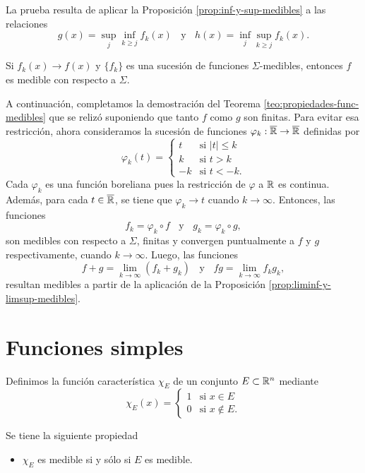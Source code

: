 La prueba resulta de aplicar la Proposici\'on \ref{prop:inf-y-sup-medibles}
a las relaciones 
\[
g(x)=\sup\limits_{j} \inf\limits_{k\geq j} f_k(x)
\;\;\mbox{ y }\;\;
h(x)=\inf\limits_{j}\sup\limits_{k \geq j} f_k(x).
\]

\begin{corolario}{}
Si $f_k(x) \to f(x)$ y $\{f_k\}$ es una sucesi\'on de funciones $\Sigma$-medibles, entonces $f$ es medible con respecto a $\Sigma$.
\end{corolario}

A continuaci\'on, completamos la demostraci\'on del Teorema \ref{teo:propiedades-func-medibles} que se reliz\'o suponiendo
que tanto $f$ como $g$ son finitas. 
Para evitar esa restricci\'on, ahora consideramos la sucesi\'on de funciones $\varphi_k:\overline{\mathbb{R}} \to \overline{\mathbb{R}}$ definidas por
\[
\varphi_k(t)=
\left\{
\begin{array}{rl}
   t  &  \mbox{si } |t|\leq k \\
   k  &  \mbox{si } t>k\\
   -k &  \mbox{si } t<-k.
\end{array}
\right.
\]
Cada $\varphi_k$ es una funci\'on boreliana pues la restricci\'on de $\varphi$ a $\mathbb{R}$ es continua. Adem\'as, para cada $t\in \overline{\mathbb{R}}$, 
se tiene que $\varphi_k \to t$ cuando $k \to \infty$. Entonces, las funciones
\[
f_k=\varphi_k \circ f \;\;\mbox{ y }
\;\;
g_k=\varphi_k \circ g,
\]
son medibles con respecto a $\Sigma$, finitas y convergen puntualmente a $f$ y $g$ respectivamente, cuando $k  \to \infty$. Luego, las funciones 
\[
f+g=\lim\limits_{k \to \infty} (f_k +g_k)
\;\;\mbox{ y }\;\;
fg=\lim\limits_{k \to \infty} f_kg_k,
\]
resultan medibles a partir de la aplicaci\'on de la Proposici\'on \ref{prop:liminf-y-limsup-medibles}.

\section{Funciones simples}
Definimos la funci\'on caracter\'istica  $\chi_E$ de un conjunto $E \subset \mathbb{R}^n$ mediante
\[
\chi_E(x)=
\left\{
\begin{array}{ll}
   1  & \mbox{si } x \in E \\
   0  & \mbox{si } x \notin E.
\end{array}
\right.
\]

Se tiene la siguiente propiedad
\begin{itemize}
    \item $\chi_E$ es medible  si y s\'olo si $E$ es medible.
\end{itemize}


